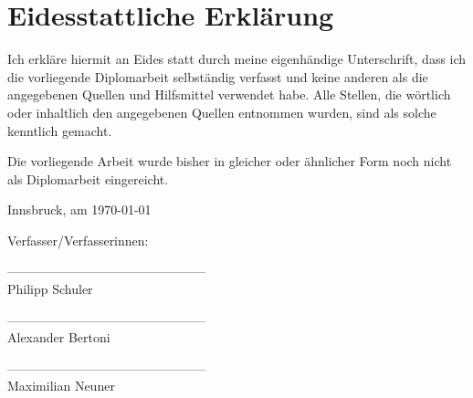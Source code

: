 \section*{Eidesstattliche Erklärung}

Ich erkläre hiermit an Eides statt durch meine eigenhändige Unterschrift, dass ich die vorliegende Diplomarbeit selbständig verfasst und keine anderen als die angegebenen Quellen und Hilfsmittel verwendet habe. Alle Stellen, die wörtlich oder inhaltlich den angegebenen Quellen entnommen wurden, sind als solche kenntlich gemacht.

Die vorliegende Arbeit wurde bisher in gleicher oder ähnlicher Form noch nicht als Diplomarbeit eingereicht.

Innsbruck, am \today

\vspace*{3cm}



Verfasser/Verfasserinnen:

\vspace*{2cm}


-----------------------------------------------\\
\hspace*{1.3cm}           Philipp Schuler

\vspace*{2cm}


-----------------------------------------------\\
\hspace*{1.3cm}           Alexander Bertoni

\vspace*{2cm}


-----------------------------------------------\\
\hspace*{1.3cm}           Maximilian Neuner



\newpage